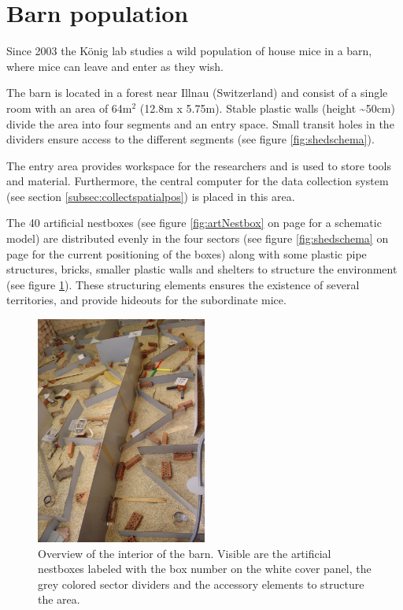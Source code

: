 \newpage
\section{Barn population}
\label{sec:shedsetup}

Since 2003 the K\"onig lab studies a wild population of house mice in a barn, where mice can leave and enter as they wish.

The barn is located in a forest near Illnau (Switzerland) and consist of a single room with an area of 64m$^2$ (12.8m x 5.75m). Stable plastic walls (height \textasciitilde50cm) divide the area into four segments and an entry space. Small transit holes in the dividers ensure access to the different segments (see figure \ref{fig:shedschema}).

The entry area provides workspace for the researchers and is used to store tools and material. Furthermore, the central computer for the data collection system (see section \ref{subsec:collectspatialpos}) is placed in this area.

The 40 artificial nestboxes (see figure \ref{fig:artNestbox} on page \pageref{fig:artNestbox} for a schematic model) are distributed evenly in the four sectors (see figure \ref{fig:shedschema} on page \pageref{fig:shedschema} for the current positioning of the boxes) along with some plastic pipe structures, bricks, smaller plastic walls and shelters to structure the environment (see figure \ref{fig:shedoverview}). These structuring elements ensures the existence of several territories, and provide hideouts for the subordinate mice.

\begin{figure}[htpb]
\begin{center}
  \includegraphics[width=0.5\textwidth]{assets/pdf/shed_overview.pdf}
  \caption[Interior of the barn]{Overview of the interior of the barn. Visible are the artificial nestboxes labeled with the box number on the white cover panel, the grey colored sector dividers and the accessory elements to structure the area.}
  \label{fig:shedoverview}
\end{center}
\end{figure}

